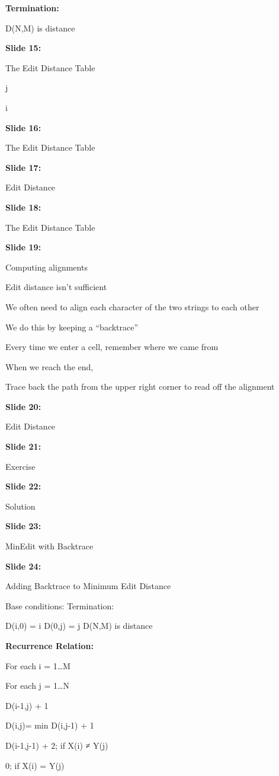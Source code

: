 \documentclass[11pt,a4paper]{article}
\begin{document}
\textbf{Termination:} 

D(N,M) is distance

\textbf{Slide 15:}

The Edit Distance Table

j

i

\textbf{Slide 16:}

The Edit Distance Table

\textbf{Slide 17:}

Edit Distance

\textbf{Slide 18:}

The Edit Distance Table

\textbf{Slide 19:}

Computing alignments

Edit distance isn’t sufficient

We often need to align each character of the two strings to each other

We do this by keeping a “backtrace”

Every time we enter a cell, remember where we came from

When we reach the end,

Trace back the path from the upper right corner to read off the alignment

\textbf{Slide 20:}

Edit Distance

\textbf{Slide 21:}

Exercise

\textbf{Slide 22:}

Solution

\textbf{Slide 23:}

MinEdit with Backtrace

\textbf{Slide 24:}

Adding Backtrace to Minimum Edit Distance

Base conditions:                                                        Termination:

D(i,0) = i         D(0,j) = j         D(N,M) is distance

\textbf{Recurrence Relation:} 

For each  i = 1…M

For each  j = 1…N

D(i-1,j) + 1

D(i,j)=     min   D(i,j-1) + 1

D(i-1,j-1) +  2; if X(i) ≠ Y(j)

0; if X(i) = Y(j)
\end{document}

